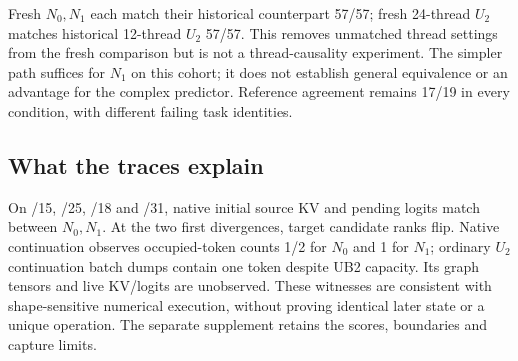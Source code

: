 Fresh $N_0,N_1$ each match their historical counterpart 57/57; fresh 24-thread $U_2$ matches historical 12-thread $U_2$ 57/57. This removes unmatched thread settings from the fresh comparison but is not a thread-causality experiment. The simpler path suffices for $N_1$ on this cohort; it does not establish general equivalence or an advantage for the complex predictor. Reference agreement remains 17/19 in every condition, with different failing task identities.

\subsection{What the traces explain}
On /15, /25, /18 and /31, native initial source KV and pending logits match between $N_0,N_1$. At the two first divergences, target candidate ranks flip. Native continuation observes occupied-token counts 1/2 for $N_0$ and 1 for $N_1$; ordinary $U_2$ continuation batch dumps contain one token despite UB2 capacity. Its graph tensors and live KV/logits are unobserved. These witnesses are consistent with shape-sensitive numerical execution, without proving identical later state or a unique operation. The separate supplement retains the scores, boundaries and capture limits.
